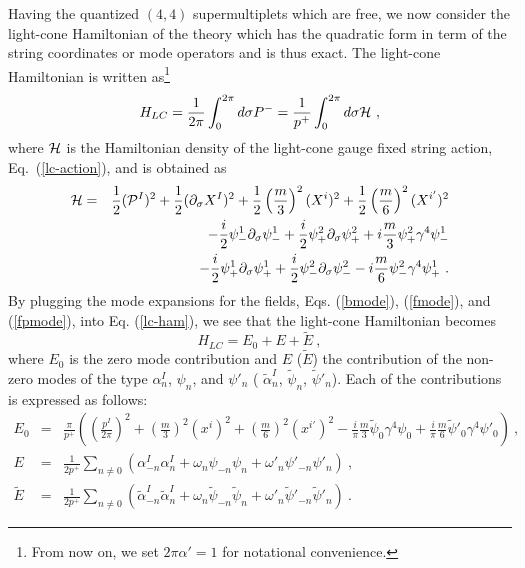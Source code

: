\documentclass[a4paper,12pt]{article}
\begin{document}
Having the quantized $(4,4)$ supermultiplets which are free, we now
consider the light-cone Hamiltonian of the theory which has the
quadratic form in term of the string coordinates or mode operators and
is thus exact.  The light-cone Hamiltonian is written as\footnote{
From now on, we set $2 \pi \alpha' = 1$ for notational convenience.}
\begin{equation}
H_{LC} 
 = \frac{1}{2 \pi} \int^{2\pi}_0 d \sigma P^-
 = \frac{1}{p^+} \int^{2\pi}_0 d \sigma {\cal H} ~,
\label{lc-ham}
\end{equation}
where ${\cal H}$ is the Hamiltonian density of the light-cone gauge
fixed string action, Eq.~(\ref{lc-action}), and is obtained as
\begin{eqnarray}
{\cal H} 
&=&  \frac{1}{2} ({\cal P}^I)^2 
    + \frac{1}{2} (\partial_\sigma X^I)^2
    +\frac{1}{2} \left( \frac{m}{3} \right)^2 (X^i)^2
    +\frac{1}{2} \left( \frac{m}{6} \right)^2 (X^{i'})^2
  \nonumber \\
 & & - \frac{i}{2} \psi^1_- \partial_\sigma \psi^1_- 
     + \frac{i}{2} \psi^2_+ \partial_\sigma \psi^2_+
     + i \frac{m}{3} \psi^2_+ \gamma^4 \psi^1_-
  \nonumber \\
 & & - \frac{i}{2} \psi^1_+ \partial_\sigma \psi^1_+
     + \frac{i}{2} \psi^2_- \partial_\sigma \psi^2_-
     - i \frac{m}{6} \psi^2_- \gamma^4 \psi^1_+ ~.
\label{can-h}
\end{eqnarray} 
By plugging the mode expansions for the fields, Eqs. (\ref{bmode}),
(\ref{fmode}), and (\ref{fpmode}), into Eq. (\ref{lc-ham}), we see
that the light-cone Hamiltonian becomes
\begin{equation}
H_{LC} = E_0 + E + \tilde{E}~,
\label{lc-h}
\end{equation}
where $E_0$ is the zero mode contribution and $E$ ($\tilde{E}$) the
contribution of the non-zero modes of the type $\alpha^I_n$, $\psi_n$,
and $\psi'_n$ ( $\tilde{\alpha}^I_n$, $\tilde{\psi}_n$,
$\tilde{\psi}'_n$).  Each of the contributions is expressed as
follows:
\begin{eqnarray}
E_0 &=& \frac{\pi}{p^+} 
  \left( \left( \frac{p^I}{2\pi} \right)^2 
       + \left( \frac{m}{3} \right)^2 (x^i)^2
       + \left( \frac{m}{6} \right)^2 (x^{i'})^2
       - \frac{i}{\pi} \frac{m}{3} \tilde{\psi}_0 \gamma^4 \psi_0
       + \frac{i}{\pi} \frac{m}{6} \tilde{\psi}'_0 \gamma^4 \psi'_0
  \right)~,
  \nonumber \\
E &=& \frac{1}{2 p^+} \sum_{n \neq 0} 
  ( \alpha^I_{-n} \alpha^I_n  
   + \omega_n \psi_{-n} \psi_n
   + \omega'_n \psi'_{-n} \psi'_n
  )~,
  \nonumber \\
\tilde{E}
  &=& \frac{1}{2 p^+} \sum_{n \neq 0} 
  ( \tilde{\alpha}^I_{-n} \tilde{\alpha}^I_n  
   + \omega_n \tilde{\psi}_{-n} \tilde{\psi}_n
   + \omega'_n \tilde{\psi}'_{-n} \tilde{\psi}'_n
  )~.
\end{eqnarray}
\end{document}

